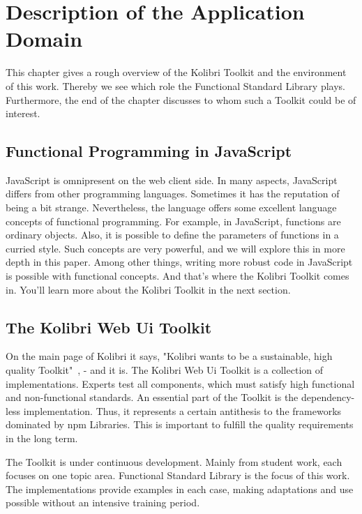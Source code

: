 \section{Description of the Application Domain}
\label{Description of the Application Domain}
This chapter gives a rough overview of the Kolibri Toolkit and the environment
of this work. Thereby we see which role the Functional Standard Library plays.
Furthermore, the end of the chapter discusses to whom such a Toolkit could be of interest.

\subsection{Functional Programming in JavaScript}
\label{sub:Functional Programming in JavaScript}
JavaScript is omnipresent on the web client side. 
In many aspects, JavaScript differs from other programming
languages. Sometimes it has the reputation of being a bit strange.
Nevertheless, the language offers some excellent language concepts of
functional programming. For example, in JavaScript, functions are ordinary
objects. Also, it is possible to define the parameters of functions in a
curried style. Such concepts are very powerful, and we will explore this in
more depth in this paper. Among other things, writing more robust code in
JavaScript is possible with functional concepts. And that's where the Kolibri
Toolkit comes in. You'll learn more about the Kolibri Toolkit in the next
section.

\subsection{The Kolibri Web Ui Toolkit}
\label{The Kolibri Web Ui Toolkit}
On the main page of Kolibri it says, "Kolibri wants to be a sustainable, high
quality Toolkit"~\cite{kolibri}, - and it is.
The Kolibri Web Ui Toolkit is a collection of implementations. Experts test all
components, which must satisfy high functional and non-functional standards. An
essential part of the Toolkit is the dependency-less implementation. Thus, it
represents a certain antithesis to the frameworks dominated by npm Libraries.
This is important to fulfill the quality requirements in the long term.

The Toolkit is under continuous development. Mainly from student work, each
focuses on one topic area. Functional Standard Library is the focus of this
work. The implementations provide examples in each case, making adaptations and
use possible without an intensive training period.

